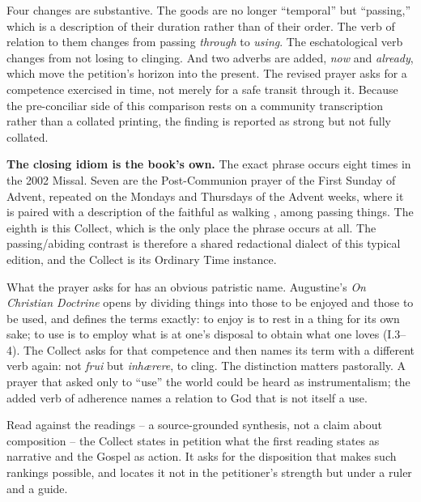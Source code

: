 Four changes are substantive. The goods are no longer ``temporal'' but ``passing,'' which is a description of their duration rather than of their order. The verb of relation to them changes from passing \emph{through} to \emph{using}. The eschatological verb changes from not losing to clinging. And two adverbs are added, \emph{now} and \emph{already}, which move the petition's horizon into the present. The revised prayer asks for a competence exercised in time, not merely for a safe transit through it. Because the pre-conciliar side of this comparison rests on a community transcription rather than a collated printing, the finding is reported as strong but not fully collated.

\textbf{The closing idiom is the book's own.} The exact phrase  occurs eight times in the 2002 Missal. Seven are the Post-Communion prayer of the First Sunday of Advent, repeated on the Mondays and Thursdays of the Advent weeks, where it is paired with a description of the faithful as walking , among passing things. The eighth is this Collect, which is the only place the phrase  occurs at all. The passing/abiding contrast is therefore a shared redactional dialect of this typical edition, and the Collect is its Ordinary Time instance.

What the prayer asks for has an obvious patristic name. Augustine's \emph{On Christian Doctrine} opens by dividing things into those to be enjoyed and those to be used, and defines the terms exactly: to enjoy is to rest in a thing for its own sake; to use is to employ what is at one's disposal to obtain what one loves (I.3--4). The Collect asks for that competence and then names its term with a different verb again: not \emph{frui} but \emph{inhærere}, to cling. The distinction matters pastorally. A prayer that asked only to ``use'' the world could be heard as instrumentalism; the added verb of adherence names a relation to God that is not itself a use.

Read against the readings -- a source-grounded synthesis, not a claim about composition -- the Collect states in petition what the first reading states as narrative and the Gospel as action. It asks for the disposition that makes such rankings possible, and locates it not in the petitioner's strength but under a ruler and a guide.
